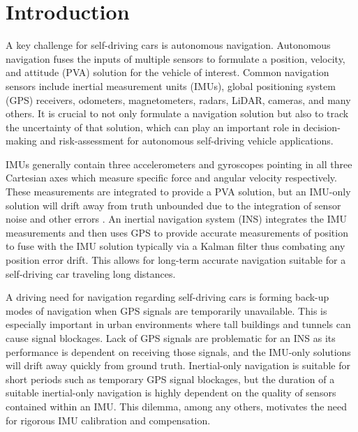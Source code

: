 
\begingroup
\allowdisplaybreaks

\section{Introduction}

A key challenge for self-driving cars is autonomous navigation. Autonomous navigation fuses the inputs of multiple sensors to formulate a position, velocity, and attitude (PVA) solution for the vehicle of interest. Common navigation sensors include inertial measurement units (IMUs), global positioning system (GPS) receivers, odometers, magnetometers, radars, LiDAR, cameras, and many others. It is crucial to not only formulate a navigation solution but also to track the uncertainty of that solution, which can play an important role in decision-making and risk-assessment for autonomous self-driving vehicle applications.

IMUs generally contain three accelerometers and gyroscopes pointing in all three Cartesian axes which measure specific force and angular velocity respectively. These measurements are integrated to provide a PVA solution, but an IMU-only solution will drift away from truth unbounded due to the integration of sensor noise and other errors \cite{groves2013principles}. An inertial navigation system (INS) integrates the IMU measurements and then uses GPS to provide accurate measurements of position to fuse with the IMU solution typically via a Kalman filter thus combating any position error drift. This allows for long-term accurate navigation suitable for a self-driving car traveling long distances.

A driving need for navigation regarding self-driving cars is forming back-up modes of navigation when GPS signals are temporarily unavailable. This is especially important in urban environments where tall buildings and tunnels can cause signal blockages. Lack of GPS signals are problematic for an INS as its performance is dependent on receiving those signals, and the IMU-only solutions will drift away quickly from ground truth. Inertial-only navigation is suitable for short periods such as temporary GPS signal blockages, but the duration of a suitable inertial-only navigation is highly dependent on the quality of sensors contained within an IMU. This dilemma, among any others, motivates the need for rigorous IMU calibration and compensation.

